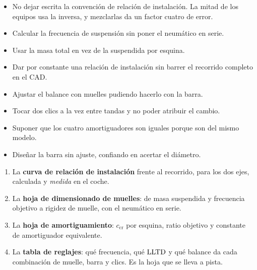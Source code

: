 \begin{ojo}
\begin{itemize}
  \item No dejar escrita la convención de relación de instalación. La mitad de
        los equipos usa la inversa, y mezclarlas da un factor cuatro de error.
  \item Calcular la frecuencia de suspensión sin poner el neumático en serie.
  \item Usar la masa total en vez de la suspendida por esquina.
  \item Dar por constante una relación de instalación sin barrer el recorrido
        completo en el CAD.
  \item Ajustar el balance con muelles pudiendo hacerlo con la barra.
  \item Tocar dos clics a la vez entre tandas y no poder atribuir el cambio.
  \item Suponer que los cuatro amortiguadores son iguales porque son del mismo
        modelo.
  \item Diseñar la barra sin ajuste, confiando en acertar el diámetro.
\end{itemize}
\end{ojo}

\begin{entregable}
\begin{enumerate}
  \item La \textbf{curva de relación de instalación} frente al recorrido, para
        los dos ejes, calculada y \emph{medida} en el coche.
  \item La \textbf{hoja de dimensionado de muelles}: de masa suspendida y
        frecuencia objetivo a rigidez de muelle, con el neumático en serie.
  \item La \textbf{hoja de amortiguamiento}: $c_{\text{cr}}$ por esquina, ratio
        objetivo y constante de amortiguador equivalente.
  \item La \textbf{tabla de reglajes}: qué frecuencia, qué $\mathrm{LLTD}$ y qué balance
        da cada combinación de muelle, barra y clics. Es la hoja que se lleva a
        pista.
\end{enumerate}
\end{entregable}

